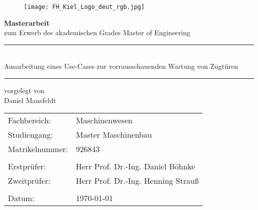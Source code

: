 \begin{titlepage}
	\renewcommand*{\thepage}{Titel}	%
	\centering
	
	\begin{figure}
		\centering
		\texttt{[image: FH\_Kiel\_Logo\_deut\_rgb.jpg]}
	\end{figure}
	
	
	\vspace{2cm}
	{\bfseries \LARGE Masterarbeit}\\
	\bigskip
	zum Erwerb des akademischen	Grades Master of Engineering
	
	\vspace{1cm}
	{\LARGE \bfseries
		\rule{\linewidth}{1pt}\\	%
		Ausarbeitung eines Use-Cases zur vorrausschauenden Wartung von Zugtüren\\
		\rule{\linewidth}{1pt}
	}
	
	\vspace{1cm}
	vorgelegt von\\
	\bigskip
	Daniel Mansfeldt
	
	
	\vspace{3cm}
	\begin{tabular}{ll}
		Fachbereich: & Maschinenwesen\\
		Studiengang: & Master Maschinenbau\\
		Matrikelnummer: & 926843\\
		&\\
		Erstprüfer: & Herr Prof. Dr.-Ing. Daniel Böhnke\\
		Zweitprüfer: & Herr Prof. Dr.-Ing. Henning Strauß\\
		&\\
		Datum: & \today
	\end{tabular}
\end{titlepage}
\cleardoublepage